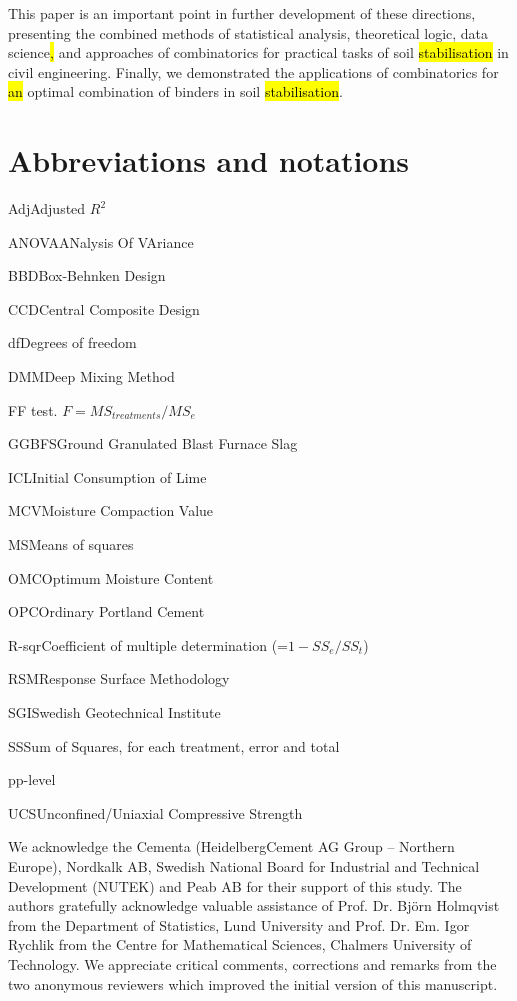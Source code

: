 \documentclass[eprint,
]{actapoly}
\begin{document}
This paper is an important point in further development of these directions, presenting the combined methods of statistical analysis, theoretical logic, data science\hl{, }and approaches of combinatorics for practical tasks of soil \hl{stabilisation} in civil engineering. Finally, we demonstrated the applications of combinatorics for \hl{an} optimal combination of binders in soil \hl{stabilisation}.

\section{Abbreviations and notations}\label{symb}
\begin{nomenclature}
\item{Adj}{Adjusted $R^2$}
\item{ANOVA}{ANalysis Of VAriance}
\item{BBD}{Box-Behnken Design}
\item{CCD}{Central Composite Design}
\item{df}{Degrees of freedom}
\item{DMM}{Deep Mixing Method}
\item{F}{F test. $F=MS_{treatments}/MS_{e}$}
\item{GGBFS}{Ground Granulated Blast Furnace Slag}
\item{ICL}{Initial Consumption of Lime}
\item{MCV}{Moisture Compaction Value}
\item{MS}{Means of squares}
\item{OMC}{Optimum Moisture Content}
\item{OPC}{Ordinary Portland Cement}
\item{R-sqr}{Coefficient of multiple determination (=$1-SS_{e}/SS_{t}$)}
\item{RSM}{Response Surface Methodology}
\item{SGI}{Swedish Geotechnical Institute}
\item{SS}{Sum of Squares, for each treatment, error and total}
\item{p}{p-level}
\item{UCS}{Unconfined/Uniaxial Compressive Strength}
\end{nomenclature}

\begin{acknowledgements}
We acknowledge the Cementa (HeidelbergCement AG Group -- Northern Europe), Nordkalk AB, Swedish National Board for Industrial and Technical Development (NUTEK) and Peab AB for their support of this study. The authors gratefully acknowledge  valuable assistance of Prof. Dr. Björn Holmqvist from the Department of Statistics, Lund University and Prof. Dr. Em. Igor Rychlik from the Centre for Mathematical Sciences, Chalmers University of Technology. We appreciate critical comments, corrections and remarks from the two anonymous reviewers which improved the initial version of this manuscript.
\end{acknowledgements}




\end{document}
